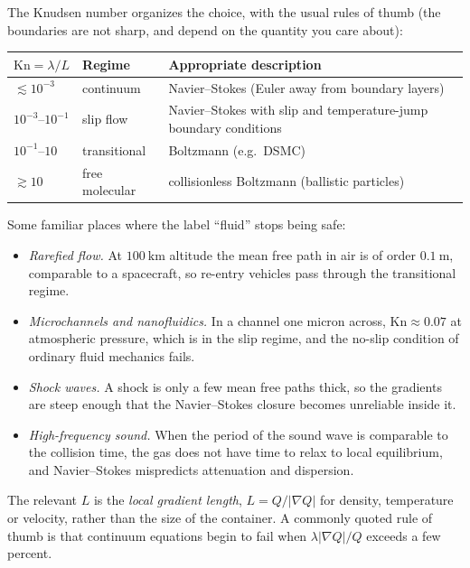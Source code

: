 The Knudsen number organizes the choice, with the usual rules of thumb (the boundaries are not sharp, and depend on the quantity you care about):
\begin{center}
{\small\setlength{\tabcolsep}{4pt}\begin{tabular}{lll}
\hline
$\mathrm{Kn}=\lambda/L$ & Regime & Appropriate description\\
\hline
$\lesssim 10^{-3}$ & continuum & Navier--Stokes (Euler away from boundary layers)\\
$10^{-3}$--$10^{-1}$ & slip flow & Navier--Stokes with slip and temperature-jump boundary conditions\\
$10^{-1}$--$10$ & transitional & Boltzmann (e.g.\ DSMC)\\
$\gtrsim10$ & free molecular & collisionless Boltzmann (ballistic particles)\\
\hline
\end{tabular}}
\end{center}
Some familiar places where the label ``fluid'' stops being safe:
\begin{itemize}
  \item \emph{Rarefied flow.} At $100\ \mathrm{km}$ altitude the mean free path in air is of order $0.1\ \mathrm{m}$, comparable to a spacecraft, so re-entry vehicles pass through the transitional regime.
  \item \emph{Microchannels and nanofluidics.} In a channel one micron across, $\mathrm{Kn}\approx0.07$ at atmospheric pressure, which is in the slip regime, and the no-slip condition of ordinary fluid mechanics fails.
  \item \emph{Shock waves.} A shock is only a few mean free paths thick, so the gradients are steep enough that the Navier--Stokes closure becomes unreliable inside it.
  \item \emph{High-frequency sound.} When the period of the sound wave is comparable to the collision time, the gas does not have time to relax to local equilibrium, and Navier--Stokes mispredicts attenuation and dispersion.
\end{itemize}
The relevant $L$ is the \emph{local gradient length}, $L=Q/|\nabla Q|$ for density, temperature or velocity, rather than the size of the container. A commonly quoted rule of thumb is that continuum equations begin to fail when $\lambda|\nabla Q|/Q$ exceeds a few percent.
